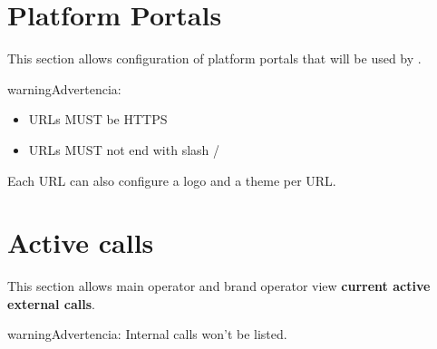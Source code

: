 \documentclass[letterpaper,10pt,spanish]{sphinxmanual}
\begin{document}
\section{Platform Portals}
\label{administration_portal/platform/portals:portals}\label{administration_portal/platform/portals:platform-portals}\label{administration_portal/platform/portals::doc}\label{administration_portal/platform/portals:id1}
This section allows configuration of platform portals that will be used by {\hyperref[administration_portal/platform/main_operators:main\string-operators]{}}.

\begin{notice}{warning}{Advertencia:}\begin{itemize}
\item {} 
URLs MUST be HTTPS

\item {} 
URLs MUST not end with slash /

\end{itemize}
\end{notice}

Each URL can also configure a logo and a theme per URL.
\label{administration_portal/platform/active_calls:active-calls}

\section{Active calls}
\label{administration_portal/platform/active_calls:call-state}\label{administration_portal/platform/active_calls::doc}\label{administration_portal/platform/active_calls:active-calls}\label{administration_portal/platform/active_calls:id1}
This section allows main operator and brand operator view \textbf{current active external calls}.

\begin{notice}{warning}{Advertencia:}
Internal calls won't be listed.
\end{notice}
\end{document}
